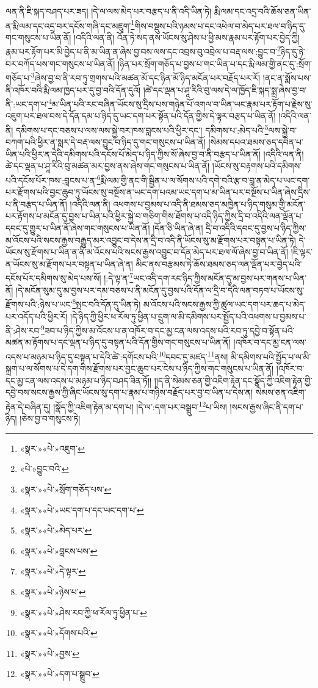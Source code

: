 ལན་ནི་ཇི་སྐད་བཤད་པར་ཟད། །དེ་ལ་ལས་མེད་པར་བརྩད་པ་ནི་འདི་ཡིན་ཏེ། རྨི་ལམ་དང་འདྲ་བའི་ཆོས་ཅན་ཡིན་ན་རྨི་ལམ་དང་འདྲ་བར་དངོས་གཞི་དང་མཇུག་\footnote{«སྣར་»«པེ་»འཇུག་}གིས་བསྡུས་པའི་ཉམས་པ་དང་འཕེལ་བ་མེད་པར་ཐལ་བ་ཉིད་དུ་གང་གསུངས་པ་ཡིན་ནོ། །འདིའི་ལན་ནི། འོན་ཏེ་སད་ནས་ཡོངས་སུ་ཤེས་པ་ཕྱི་མས་རྣམ་པར་རྟོག་པར་བྱེད་ཀྱི། རྣམ་པར་རྟོག་པར་མི་བྱེད་པ་ནི་མ་ཡིན་ན་ཞེས་བྱ་བས་ལས་དང་འབྲས་བུ་འབྲེལ་པ་བརྡ་ལས་:བྱུང་བ་\footnote{«པེ་»བྱུང་བའི་}ཉིད་དུ་ཉེ་བར་བཀོད་པས་གང་གསུངས་པ་ཡིན་ནོ། །ཉིན་པར་སྲོག་གཅོད་པ་བྱས་པ་གང་ཡིན་པ་དང་རྨི་ལམ་གྱི་ནང་དུ་:སྲོག་གཅོད་པ་\footnote{«སྣར་»«པེ་»སྲོག་གཅོད་པས་}ཞེས་བྱ་བ་ནི་རབ་ཏུ་གྲགས་པའི་མཚན་མོ་དང་ཉིན་མོ་ཉིད་མངོན་པར་བརྗོད་པར་རོ། །ནང་ན་སྨོས་པས་ནི་འཁོར་བའི་རྨི་ལམ་ཁྱད་པར་དུ་བྱ་བའི་དོན་དུའོ། །ཚེ་དང་ལྡན་པ་ཤཱ་རིའི་བུ་ལས་དེ་ལ་ཁྱོད་ཇི་སྐད་སྨྲ་ཞེས་བྱ་བ་ནི་:ཡང་དག་པ་\footnote{«སྣར་»«པེ་»ཡང་དག་པ་དང་ཡང་དག་པ་}མ་ཡིན་པའི་རང་བཞིན་ཡོངས་སུ་དྲིས་པས་གཉེན་པོ་འགལ་བ་ཡིན་ཡང་རྣམ་པར་རྟོག་པ་རྗེས་སུ་འཇུག་པར་ཐལ་བས་དེ་དོན་དམ་པ་ཉིད་དུ་ཡང་དག་པར་སྟོན་པའི་དོན་གྱིས་དེ་ལྟར་བརྩད་པ་ཡིན་ནོ། །འདིའི་ལན་ནི། དམིགས་པ་དང་བཅས་པ་ལས་ལས་སྐྱེ་བར་ཁས་བླངས་པའི་ཕྱིར་དང་། དམིགས་པ་:མེད་པའི་\footnote{«སྣར་»«པེ་»མེད་པར་}ལས་སྐྱེ་བ་བཀག་པའི་ཕྱིར་ན་སླར་དེ་བརྡ་ལས་བྱུང་བ་ཉིད་དུ་གང་གསུངས་པ་ཡིན་ནོ། །སེམས་དཔའ་ཐམས་ཅད་དབེན་པ་ཡིན་པའི་ཕྱིར་ན་དེའི་དམིགས་པའི་དངོས་པོ་མེད་པ་ཉིད་ཀྱིས་སོ་ཞེས་བྱ་བ་ནི་བརྩད་པ་ཡིན་ནོ། །འདིའི་ལན་ནི། ཚེ་དང་ལྡན་པ་ཤཱ་རིའི་བུ་མཚན་མར་བྱས་ནས་ཞེས་གང་གསུངས་པ་ཡིན་ནོ། །ཡོངས་སུ་བརྟགས་པའི་དམིགས་པའི་དངོས་པོར་ཁས་:བླངས་པ་ན་\footnote{«སྣར་»«པེ་»བླངས་པས་}རྨི་ལམ་གྱི་ནང་གི་སྦྱིན་པ་ལ་སོགས་པའི་དགེ་བའི་རྩ་བ་བླ་ན་མེད་པ་ཡང་དག་པར་རྫོགས་པའི་བྱང་ཆུབ་ཏུ་ཡོངས་སུ་བསྔོས་ན་ཡང་དག་པའམ་ཡང་དག་པ་མ་ཡིན་པར་བསྔོས་པ་ཡིན་ཞེས་དྲིས་པ་ནི་བརྩད་པ་ཡིན་ནོ། །འདིའི་ལན་ནི། འཕགས་པ་བྱམས་པ་འདི་ནི་ཐམས་ཅད་མཁྱེན་པ་ཉིད་གསུམ་གྱི་མངོན་པར་རྟོགས་པ་མངོན་དུ་བྱས་པ་ཡིན་པའི་ཕྱིར་སྐྱེ་བ་གཅིག་གིས་ཐོགས་པ་འདི་ཉིད་ཀྱིས་དྲི་བ་འདིའི་ལན་ལྡོན་པ་དབང་དུ་གྱུར་པ་ཡིན་ནོ་ཞེས་གང་གསུངས་པ་ཡིན་ནོ། །དོན་ཅི་ཡིན་ཞེ་ན། དྲི་བ་འདིའི་དབང་དུ་བྱས་པ་ཉིད་ཀྱིས་མ་འོངས་པའི་སངས་རྒྱས་བརྒྱུད་མར་འབྱུང་བ་དེས་ན་དྲི་བ་འདི་ནི་ཡོངས་སུ་མ་རྫོགས་པར་བསྟན་པ་ཡིན་ཏེ། དེ་ཡོངས་སུ་རྫོགས་པ་ཡིན་ན་ནི་མ་འོངས་པའི་སངས་རྒྱས་འབྱུང་བ་དོན་མེད་པར་ཐལ་ལོ་ཞེས་བྱ་བ་ཡིན་ནོ། །ཇི་ལྟར་ན་ཡོངས་སུ་མ་རྫོགས་པར་བསྟན་པ་ཡིན་ཞེ་ན། མིང་ནས་བརྩམས་ཏེ་ཆོས་ཐམས་ཅད་ལན་ལྡོན་པར་བྱེད་པའི་དངོས་པོར་དམིགས་སུ་མེད་པས་སོ། །:དེ་ལྟ་ན་\footnote{«སྣར་»«པེ་»དེ་ལྟར་}ཡང་འདི་དག་རང་ཉིད་ཀྱིས་མངོན་དུ་མ་བྱས་པར་གནས་པ་ཡིན་ནོ། །དེ་མངོན་སུམ་དུ་མ་བྱས་པར་དམ་བཅས་པ་ནི་མངོན་དུ་བྱས་པའི་དོན་ལ་དྲི་བ་དེའི་ལན་བཏབ་པ་ཡོངས་སུ་རྫོགས་པའི་:ཉེས་པ་ཡང་\footnote{«སྣར་»«པེ་»ཉེས་པ་}སྤང་བའི་དོན་དུ་ཡིན་ཏེ། མ་འོངས་པའི་སངས་རྒྱས་ཀྱི་ཚུལ་ཡང་དག་པར་ཆད་པ་མེད་པར་འདོད་པའི་ཕྱིར་རོ། །དེ་ཉིད་ཀྱི་ཕྱིར་ཕ་རོལ་ཏུ་ཕྱིན་པ་དྲུག་ལ་མི་དམིགས་པར་སྤྱོད་པའི་འཕགས་པ་བྱམས་པ་ནི་:ཤེས་རབ་\footnote{«སྣར་»«པེ་»ཤེས་རབ་ཀྱི་ཕ་རོལ་ཏུ་ཕྱིན་པ་}ཟབ་པ་ཉིད་ཀྱིས་མ་འོངས་པ་ན་འཁོར་བ་དང་མྱ་ངན་ལས་འདས་པའི་རབ་ཏུ་དབྱེ་བ་སྟོན་པའི་མཚན་མ་རྟོགས་པ་དང་ལྡན་པ་ཉིད་དུ་བསྟན་པའི་དོན་གྱིས་གང་གསུངས་པ་ཡིན་ནོ། །འཁོར་བ་དང་མྱ་ངན་ལས་འདས་པ་མཉམ་པ་ཉིད་དུ་བསྟན་པ་དེའི་ཚེ་:དགོངས་པའི་\footnote{«སྣར་»«པེ་»དོགས་པའི་}དབང་དུ་མཛད་\footnote{«སྣར་»«པེ་»བྱས་}ནས། མི་དམིགས་པའི་སྤྱོད་པ་ལ་མི་སྐྲག་པ་ལ་སོགས་པ་དེ་དག་གིས་རྫོགས་པར་བྱང་ཆུབ་པར་ངེས་པ་ཉིད་ཀྱིས་གང་གསུངས་པ་ཡིན་ནོ། །འཁོར་བ་དང་མྱ་ངན་ལས་འདས་པ་མཉམ་པ་ཉིད་བཤད་ཟིན་ཏོ།། །།ད་ནི་སེམས་ཅན་གྱི་འཇིག་རྟེན་དང་སྣོད་ཀྱི་འཇིག་རྟེན་གྱི་དབྱེ་བས་སངས་རྒྱས་ཀྱི་ཞིང་ཡོངས་སུ་དག་པ་རྣམ་པ་གཉིས་བརྗོད་པར་བྱ་བ་ཡིན་པ་དེས་ན། སེམས་ཅན་འཇིག་རྟེན་དེ་བཞིན་དུ། །སྣོད་ཀྱི་འཇིག་རྟེན་མ་དག་པ། །དེ་ལ་:དག་པར་བསྒྲུབ་\footnote{«སྣར་»«པེ་»དག་པ་སྒྲུབ་}པ་ཡིས། །སངས་རྒྱས་ཞིང་ནི་དག་པ་ཉིད། །ཅེས་བྱ་བ་གསུངས་ཏེ། 